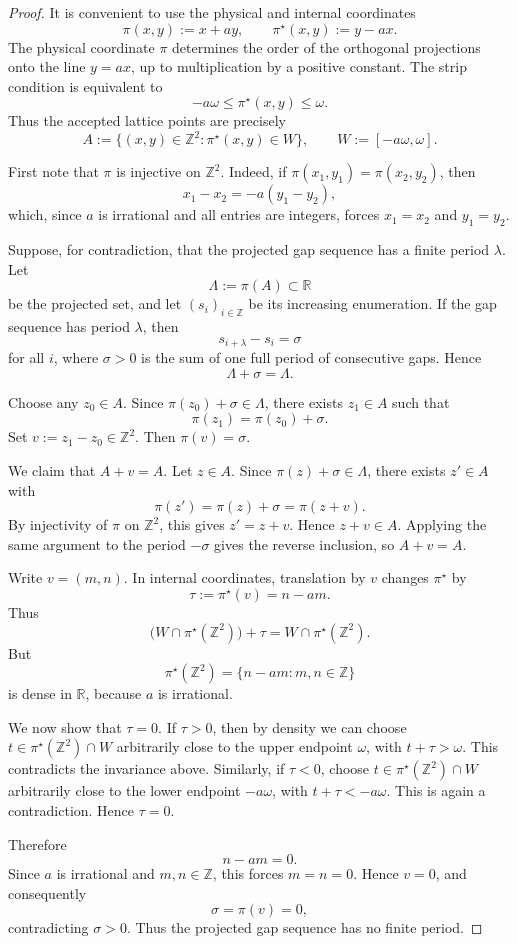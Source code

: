 \documentclass[11pt]{article}
\begin{document}
\begin{proof}
It is convenient to use the physical and internal coordinates
\[
    \pi(x,y) := x + ay,
    \qquad
    \pi^\star(x,y) := y - ax.
\]
The physical coordinate \(\pi\) determines the order of the orthogonal
projections onto the line \(y=ax\), up to multiplication by a positive
constant.  The strip condition is equivalent to
\[
    -a\omega \le \pi^\star(x,y) \le \omega.
\]
Thus the accepted lattice points are precisely
\[
    A := \{(x,y)\in\mathbb Z^2 : \pi^\star(x,y)\in W\},
    \qquad
    W := [-a\omega,\omega].
\]

First note that \(\pi\) is injective on \(\mathbb Z^2\).  Indeed, if
\(\pi(x_1,y_1)=\pi(x_2,y_2)\), then
\[
    x_1-x_2 = -a(y_1-y_2),
\]
which, since \(a\) is irrational and all entries are integers, forces
\(x_1=x_2\) and \(y_1=y_2\).

Suppose, for contradiction, that the projected gap sequence has a finite
period \(\lambda\).  Let
\[
    \Lambda := \pi(A)\subset\mathbb R
\]
be the projected set, and let \((s_i)_{i\in\mathbb Z}\) be its increasing
enumeration.  If the gap sequence has period \(\lambda\), then
\[
    s_{i+\lambda}-s_i = \sigma
\]
for all \(i\), where \(\sigma>0\) is the sum of one full period of consecutive
gaps.  Hence
\[
    \Lambda+\sigma=\Lambda.
\]

Choose any \(z_0\in A\).  Since \(\pi(z_0)+\sigma\in\Lambda\), there exists
\(z_1\in A\) such that
\[
    \pi(z_1)=\pi(z_0)+\sigma.
\]
Set \(v:=z_1-z_0\in\mathbb Z^2\).  Then \(\pi(v)=\sigma\).

We claim that \(A+v=A\).  Let \(z\in A\).  Since
\(\pi(z)+\sigma\in\Lambda\), there exists \(z'\in A\) with
\[
    \pi(z')=\pi(z)+\sigma=\pi(z+v).
\]
By injectivity of \(\pi\) on \(\mathbb Z^2\), this gives \(z'=z+v\).  Hence
\(z+v\in A\).  Applying the same argument to the period \(-\sigma\) gives
the reverse inclusion, so \(A+v=A\).

Write \(v=(m,n)\).  In internal coordinates, translation by \(v\) changes
\(\pi^\star\) by
\[
    \tau := \pi^\star(v)=n-am.
\]
Thus
\[
    \bigl(W\cap \pi^\star(\mathbb Z^2)\bigr)+\tau
    =
    W\cap \pi^\star(\mathbb Z^2).
\]
But
\[
    \pi^\star(\mathbb Z^2)=\{n-am:m,n\in\mathbb Z\}
\]
is dense in \(\mathbb R\), because \(a\) is irrational.

We now show that \(\tau=0\).  If \(\tau>0\), then by density we can choose
\(t\in\pi^\star(\mathbb Z^2)\cap W\) arbitrarily close to the upper endpoint
\(\omega\), with \(t+\tau>\omega\).  This contradicts the invariance above.
Similarly, if \(\tau<0\), choose
\(t\in\pi^\star(\mathbb Z^2)\cap W\) arbitrarily close to the lower endpoint
\(-a\omega\), with \(t+\tau<-a\omega\).  This is again a contradiction.
Hence \(\tau=0\).

Therefore
\[
    n-am=0.
\]
Since \(a\) is irrational and \(m,n\in\mathbb Z\), this forces \(m=n=0\).
Hence \(v=0\), and consequently
\[
    \sigma=\pi(v)=0,
\]
contradicting \(\sigma>0\).  Thus the projected gap sequence has no finite
period.
\end{proof}
\end{document}
